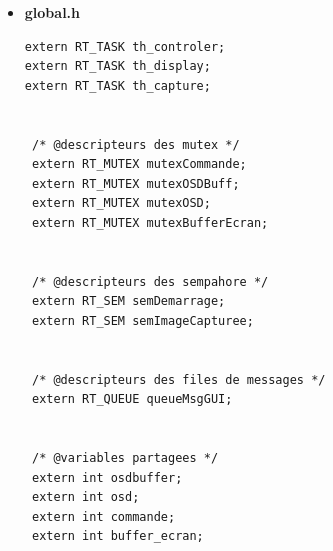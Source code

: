 \documentclass[11pt, a4paper]{paper}
\begin{document}
\begin{itemize}
\begin{lstlisting}
        jpegimage = d_new_jpegimage();
        d_jpegimage_compress(jpegimage,frame);
        message = d_new_message();
        d_message_put_jpeg_image(message,jpegimage);

        rt_printf("th_capture  : Envoie de l'image capturee \n");
        if (write_in_queue(&queueMsgGUI, message, sizeof (DMessage)) < 0) {message->free(message);}

    }
}


void th_display (void *arg)
{

  DImage *image_capturee;
  DMessage *message;
  DJpegimage *jpegimage;


  rt_printf ("th_display :  en attente de demarrage\n");
  rt_sem_p(&semDemarrage, TM_INFINITE);

  rt_printf("th_display : Demarrage Succes\n");


  while (1)
    {
        if ((err = rt_queue_read (&queueMsgGUI, &image_capturee, sizeof (DMessage), TM_INFINITE)) >= 0) {

            rt_mutex_acquire (&mutexOSD, TM_INFINITE); //osd_var := Read_data(osd)
            osd_var = osd;
            rt_mutex_release (&mutexOSD);

            img = encode(image_capturee, osd_var);

            rt_mutex_acquire (&mutexBufferEcran, TM_INFINITE); //osd_var := Read_data(osd)
            buffer_ecran = img;
            rt_mutex_release (&mutexBufferEcran);
      }
      else  {rt_printf ("th_display : Error msg queue write: %s\n", strerror (-err));}

    }
}

\end{lstlisting}

\item \large{\bf global.h}

\lstset{language=C} 
\begin{lstlisting}
extern RT_TASK th_controler;
extern RT_TASK th_display;
extern RT_TASK th_capture;


 /* @descripteurs des mutex */
 extern RT_MUTEX mutexCommande;
 extern RT_MUTEX mutexOSDBuff;
 extern RT_MUTEX mutexOSD;
 extern RT_MUTEX mutexBufferEcran;


 /* @descripteurs des sempahore */
 extern RT_SEM semDemarrage;
 extern RT_SEM semImageCapturee;


 /* @descripteurs des files de messages */
 extern RT_QUEUE queueMsgGUI;


 /* @variables partagees */
 extern int osdbuffer;
 extern int osd;
 extern int commande;
 extern int buffer_ecran;



\end{lstlisting}
\end{itemize}
\end{document}
